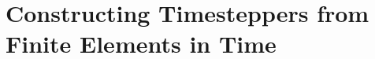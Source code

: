 \chapter{Constructing Timesteppers from Finite Elements in Time}\label{cha:constructing timesteppers}
